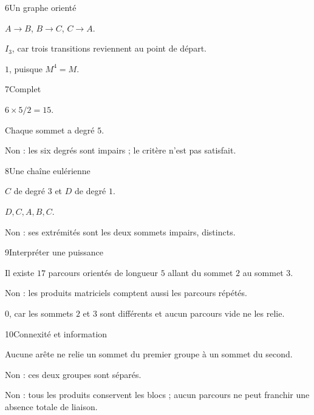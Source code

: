 \begin{corrige}{6}{Un graphe orienté}
\begin{questions}
\item $A\to B$, $B\to C$, $C\to A$.
\item $I_3$, car trois transitions reviennent au point de départ.
\item $1$, puisque $M^4=M$.
\end{questions}
\end{corrige}
\begin{corrige}{7}{Complet}
\begin{questions}
\item $6\times5/2=15$.
\item Chaque sommet a degré $5$.
\item Non : les six degrés sont impairs ; le critère n’est pas satisfait.
\end{questions}
\end{corrige}
\begin{corrige}{8}{Une chaîne eulérienne}
\begin{questions}
\item $C$ de degré $3$ et $D$ de degré $1$.
\item $D,C,A,B,C$.
\item Non : ses extrémités sont les deux sommets impairs, distincts.
\end{questions}
\end{corrige}
\begin{corrige}{9}{Interpréter une puissance}
\begin{questions}
\item Il existe $17$ parcours orientés de longueur $5$ allant du sommet $2$ au sommet $3$.
\item Non : les produits matriciels comptent aussi les parcours répétés.
\item $0$, car les sommets $2$ et $3$ sont différents et aucun parcours vide ne les relie.
\end{questions}
\end{corrige}
\begin{corrige}{10}{Connexité et information}
\begin{questions}
\item Aucune arête ne relie un sommet du premier groupe à un sommet du second.
\item Non : ces deux groupes sont séparés.
\item Non : tous les produits conservent les blocs ; aucun parcours ne peut franchir une absence totale de liaison.
\end{questions}
\end{corrige}
